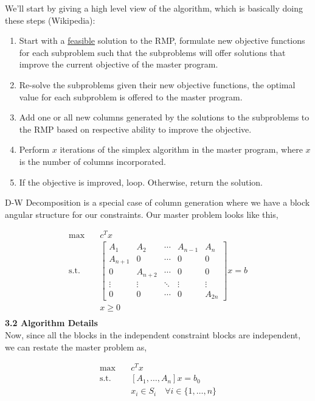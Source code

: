 \documentclass[11pt]{article}
\begin{document}
\noindent We'll start by giving a high level view of the algorithm, which is basically doing these steps (Wikipedia):
\begin{enumerate}
    \item Start with a \underline{feasible} solution to the RMP, formulate new objective functions for each subproblem such that the subproblems will offer solutions that improve the current objective of the master program.
    \item Re-solve the subproblems given their new objective functions, the optimal value for each subproblem is offered to the master program.
    \item Add one or all new columns generated by the solutions to the subproblems to the RMP based on respective ability to improve the objective.
    \item Perform \(x\) iterations of the simplex algorithm in the master program, where \(x\) is the number of columns incorporated.
    \item If the objective is improved, loop. Otherwise, return the solution.
\end{enumerate}

\noindent D-W Decomposition is a special case of column generation where we have a block angular structure for our constraints. Our master problem looks like this,

$$
\begin{aligned}
    \text{max} \quad & c^T x \\
    \text{s.t.} \quad & \begin{bmatrix}
        A_{1} & A_{2} & \cdots & A_{n-1} & A_{n} \\
        A_{n+1} & 0 & \cdots & 0 & 0 \\
        0 & A_{n+2} & \cdots & 0 & 0 \\
        \vdots & \vdots & \ddots & \vdots & \vdots \\
        0 & 0 & \cdots & 0 & A_{2n}
    \end{bmatrix} x = b \\
    & x \geq 0\\
\end{aligned}
$$
\noindent \textbf{3.2 Algorithm Details}
\\

\noindent Now, since all the blocks in the independent constraint blocks are independent, we can restate the master problem as,

$$
\begin{aligned}
    \text{max} \quad & c^T x \\
    \text{s.t.} \quad & [A_1, \ldots, A_n] x = b_0 \\
    & x_i \in S_i \quad \forall i \in \{1, \ldots, n\}
\end{aligned}
$$
\end{document}
